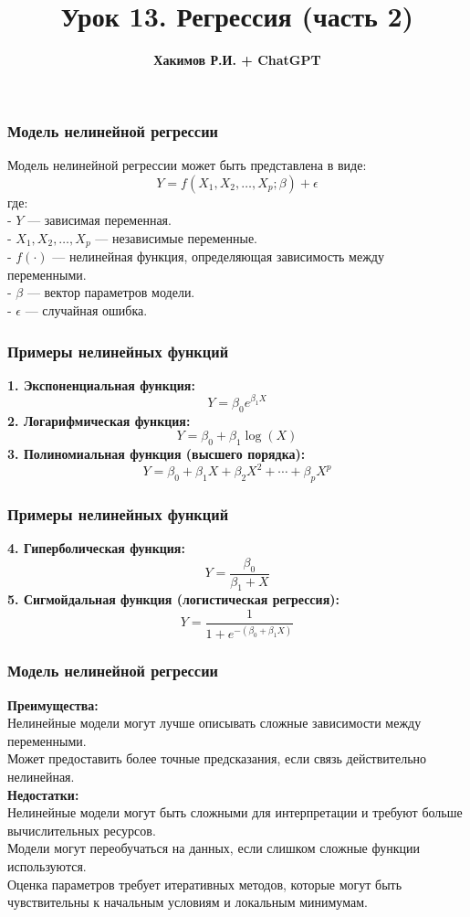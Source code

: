\documentclass[aspectratio=169]{beamer}
\title{\bf Урок 13. Регрессия (часть 2)}
\author{{\bf Хакимов Р.И. + ChatGPT}}
\date[\today]{}
\begin{document}
\begin{frame}
\titlepage
\end{frame}

\begin{frame}
\frametitle{Модель нелинейной регрессии}
Модель нелинейной регрессии может быть представлена в виде:
\[
Y = f(X_1, X_2, \ldots, X_p; \beta) + \epsilon
\]
где:\\
- \( Y \) — зависимая переменная.\\
- \( X_1, X_2, \ldots, X_p \) — независимые переменные.\\
- \( f(\cdot) \) — нелинейная функция, определяющая зависимость между переменными.\\
- \( \beta \) — вектор параметров модели.\\
- \( \epsilon \) — случайная ошибка.
\end{frame}

\begin{frame}
\frametitle{Примеры нелинейных функций}
{\bf 1. Экспоненциальная функция:}
   \[
   Y = \beta_0 e^{\beta_1 X}
   \]
{\bf 2. Логарифмическая функция:}
   \[
   Y = \beta_0 + \beta_1 \log(X)
   \]
{\bf 3. Полиномиальная функция (высшего порядка):}
   \[
   Y = \beta_0 + \beta_1 X + \beta_2 X^2 + \cdots + \beta_p X^p
   \]
\end{frame}

\begin{frame}
\frametitle{Примеры нелинейных функций}
{\bf 4. Гиперболическая функция:}
   \[
   Y = \frac{\beta_0}{\beta_1 + X}
   \]
{\bf 5. Сигмойдальная функция (логистическая регрессия):}
   \[
   Y = \frac{1}{1 + e^{-(\beta_0 + \beta_1 X)}}
   \]
\end{frame}

\begin{frame}
\frametitle{Модель нелинейной регрессии}
{\bf Преимущества:}\\
 Нелинейные модели могут лучше описывать сложные зависимости между переменными.\\
 Может предоставить более точные предсказания, если связь действительно нелинейная.
\newline\\
{\bf Недостатки:}\\
 Нелинейные модели могут быть сложными для интерпретации и требуют больше вычислительных ресурсов.\\
 Модели могут переобучаться на данных, если слишком сложные функции используются.\\
 Оценка параметров требует итеративных методов, которые могут быть чувствительны к начальным условиям и локальным минимумам.
\end{frame}
\end{document}
